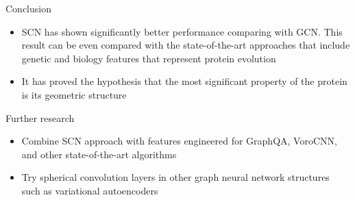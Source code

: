 \documentclass{beamer}
\begin{document}
\begin{frame}{Conclusion}
        \begin{itemize}
            \item SCN has shown significantly better performance comparing with GCN. This result can be even compared with
            the state-of-the-art approaches that include genetic and biology features that represent protein evolution
            \item It has proved the hypothesis that the most significant property of the protein is its geometric structure
        \end{itemize}
\end{frame}
\begin{frame}{Further research}
    \begin{itemize}
        \item Combine SCN approach with features engineered for GraphQA, VoroCNN, and other state-of-the-art algorithms
        \item Try spherical convolution layers in other graph neural network structures such as variational autoencoders
    \end{itemize}
\end{frame}
\end{document}
